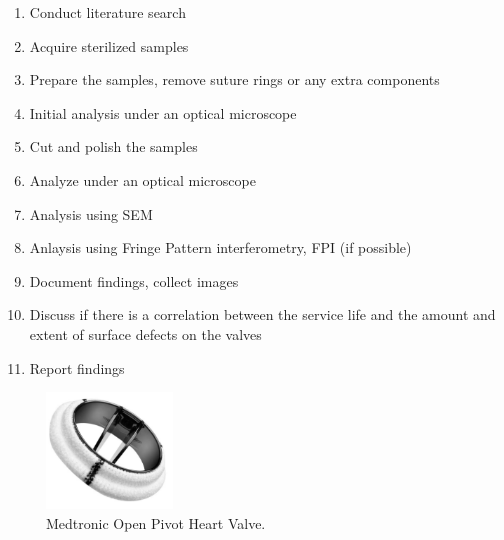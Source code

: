 \begin{enumerate}
    \item Conduct literature search
    \item Acquire sterilized samples
    \item Prepare the samples, remove suture rings or any extra components
    \item Initial analysis under an optical microscope
    \item Cut and polish the samples
    \item Analyze under an optical microscope
    \item Analysis using SEM
    \item Anlaysis using Fringe Pattern interferometry, FPI (if possible)
    \item Document findings, collect images
    \item Discuss if there is a correlation between the service life and the amount and extent of surface defects on the valves
    \item Report findings
\end{enumerate}

\begin{figure}
    \centering
    \includegraphics[width=0.3\textwidth]{medtronic_open_pivot.png}
    \caption{Medtronic Open Pivot Heart Valve. \cite*{medtronic_image}}
    \label{fig:medtronicopenpivot}
\end{figure}